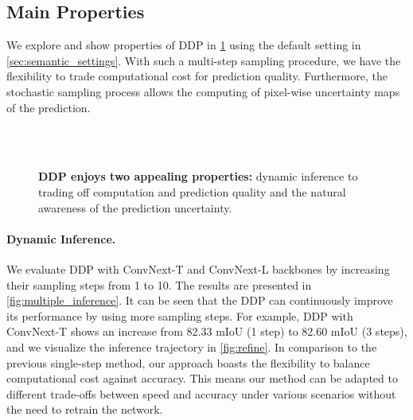 \documentclass[10pt,twocolumn,letterpaper]{article}
\newcommand{\ours}[0]{DDP\xspace}
\begin{document}
\subsection{Main Properties}
We explore and show properties of \ours in \cref{fig:properties} using the default setting in \cref{sec:semantic_settings}.
With such a multi-step sampling procedure, we have the flexibility to trade computational cost for prediction quality.
Furthermore, the stochastic sampling process allows the computing of pixel-wise uncertainty maps of the prediction.

\begin{figure}
  \centering
  \vspace{-0.5em}
  \\
  \vspace{-0.5em}
  \\
  \vspace{1em}
  \caption{\textbf{DDP enjoys two appealing properties:} dynamic inference to trading off computation and prediction quality and the natural awareness of the prediction uncertainty.}
  \label{fig:properties}
\end{figure}

\paragraph{Dynamic Inference.}
We evaluate \ours with ConvNext-T and ConvNext-L backbones by increasing their sampling steps from 1 to 10.
The results are presented in \cref{fig:multiple_inference}.
It can be seen that the DDP can continuously improve its performance by using more sampling steps.
For example, DDP with ConvNext-T shows an increase from 82.33 mIoU (1 step) to 82.60 mIoU (3 steps), and we visualize the inference trajectory in \cref{fig:refine}.
In comparison to the previous single-step method, our approach boasts the flexibility to balance computational cost against accuracy. This means our method can be adapted to different trade-offs between speed and accuracy under various scenarios without the need to retrain the network.
\end{document}
